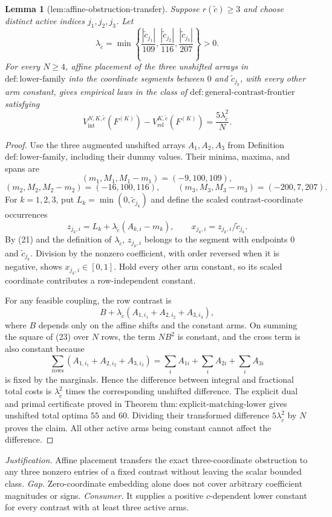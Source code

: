 \documentclass{article}
\newtheorem{lemma}{Lemma}
\begin{document}
\begin{lemma}[lem:affine-obstruction-transfer]\label{lem:affine-obstruction-transfer}
Suppose \(r(\widetilde c)\ge3\) and choose distinct active indices \(j_1,j_2,j_3\).  Let
\[
 \lambda_{\widetilde c}
 =\min\left\{\frac{|\widetilde c_{j_1}|}{109},
 \frac{|\widetilde c_{j_2}|}{116},
 \frac{|\widetilde c_{j_3}|}{207}\right\}>0.
\]
For every \(N\ge4\), affine placement of the three unshifted arrays in \(\mathrm{def{:}lower\mbox{-}family}\) into the coordinate segments between \(0\) and \(\widetilde c_{j_k}\), with every other arm constant, gives empirical laws in the class of \(\mathrm{def{:}general\mbox{-}contrast\mbox{-}frontier}\) satisfying
\[
 V_{\mathrm{int}}^{N,K,\widetilde c}(F^{(K)})-
 V_{\mathrm{rel}}^{K,\widetilde c}(F^{(K)})
 =\frac{5\lambda_{\widetilde c}^2}{N}.
\]
\end{lemma}
\begin{proof}
Use the three augmented unshifted arrays \(A_1,A_2,A_3\) from Definition \(\mathrm{def{:}lower\mbox{-}family}\), including their dummy values.  Their minima, maxima, and spans are
\[
 (m_1,M_1,M_1-m_1)=(-9,100,109),
\]
\[
 (m_2,M_2,M_2-m_2)=(-16,100,116),\qquad
 (m_3,M_3,M_3-m_3)=(-200,7,207). \tag{21}
\]
For \(k=1,2,3\), put \(L_k=\min(0,\widetilde c_{j_k})\) and define the scaled contrast-coordinate occurrences
\[
 z_{j_k,i}=L_k+\lambda_{\widetilde c}(A_{k,i}-m_k),\qquad
 x_{j_k,i}=z_{j_k,i}/\widetilde c_{j_k}. \tag{22}
\]
By (21) and the definition of \(\lambda_{\widetilde c}\), \(z_{j_k,i}\) belongs to the segment with endpoints \(0\) and \(\widetilde c_{j_k}\).  Division by the nonzero coefficient, with order reversed when it is negative, shows \(x_{j_k,i}\in[0,1]\).  Hold every other arm constant, so its scaled coordinate contributes a row-independent constant.

For any feasible coupling, the row contrast is
\[
 B+\lambda_{\widetilde c}(A_{1,i_1}+A_{2,i_2}+A_{3,i_3}), \tag{23}
\]
where \(B\) depends only on the affine shifts and the constant arms.  On summing the square of (23) over \(N\) rows, the term \(NB^2\) is constant, and the cross term is also constant because
\[
 \sum_{\mathrm{rows}}(A_{1,i_1}+A_{2,i_2}+A_{3,i_3})
 =\sum_iA_{1i}+\sum_iA_{2i}+\sum_iA_{3i}
\]
is fixed by the marginals.  Hence the difference between integral and fractional total costs is \(\lambda_{\widetilde c}^2\) times the corresponding unshifted difference.  The explicit dual and primal certificate proved in Theorem \(\mathrm{thm{:}explicit\mbox{-}matching\mbox{-}lower}\) gives unshifted total optima \(55\) and \(60\).  Dividing their transformed difference \(5\lambda_{\widetilde c}^2\) by \(N\) proves the claim.  All other active arms being constant cannot affect the difference.
\end{proof}
\par\smallskip\noindent \textit{Justification.} Affine placement transfers the exact three-coordinate obstruction to any three nonzero entries of a fixed contrast without leaving the scalar bounded class. \textit{Gap.} Zero-coordinate embedding alone does not cover arbitrary coefficient magnitudes or signs. \textit{Consumer.} It supplies a positive \(c\)-dependent lower constant for every contrast with at least three active arms.
\end{document}
